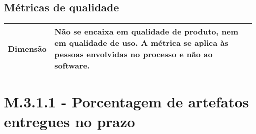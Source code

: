 	\subsection{Métricas de qualidade}

	\begin{tabular}{ |p{4cm}|p{8cm}| }
	\hline
	   Dimensão 		& 	Não se encaixa em qualidade de produto, nem em qualidade de uso. A métrica se aplica às pessoas envolvidas no processo e não ao software.	 \\
	 \hline
	\end{tabular}



\section{M.3.1.1 - Porcentagem de artefatos entregues no prazo} %

